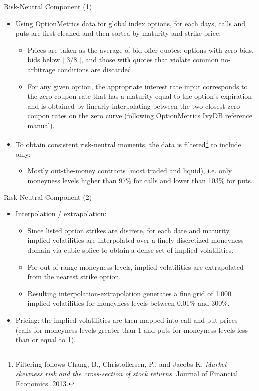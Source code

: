 \documentclass{beamer}
\begin{document}
\begin{frame}{Risk-Neutral Component (1)}
\begin{itemize}
\item Using OptionMetrics data for global index options, for each days, calls and puts are first cleaned and then sorted by maturity and strike price:
	\begin{itemize}
	\item Prices are taken as the average of bid-offer quotes; options with zero bids, bids below [ 3/8 ], and those with quotes that violate common no-arbitrage conditions are discarded.
	\item For any given option, the appropriate interest rate input corresponds to the zero-coupon rate that has a maturity equal to the option's expiration and is obtained by linearly 				interpolating between the two closest zero-coupon rates on the zero curve (following OptionMetrics IvyDB reference manual).
	\end{itemize}
\vfill	
\item To obtain consistent risk-neutral moments, the data is filtered\footnote{\tiny Filtering follows Chang, B., Christoffersen, P., and Jacobs K. {\em Market skewness risk and the cross-section of stock returns.} Journal of Financial Economics. 2013.} to include only:
	\begin{itemize}
	\item Mostly out-the-money contracts (most traded and liquid), i.e. only moneyness levels higher than 97\% for calls and lower than 103\% for puts.
	\end{itemize}
\vfill
\end{itemize}
\end{frame}

\begin{frame}{Risk-Neutral Component (2)}
\begin{itemize}
\item Interpolation / extrapolation:
	\begin{itemize}
	\item Since listed option strikes are discrete, for each date and maturity, implied volatilities are interpolated over a finely-discretized moneyness domain via cubic splice to obtain a dense 			set of implied volatilities.
	\item For out-of-range moneyness levels, implied volatilities are extrapolated from the nearest strike option.
	\item Resulting interpolation-extrapolation generates a fine grid of 1,000 implied volatilities for moneyness levels between 0.01\% and 300\%.
	\end{itemize}
\vfill
\item Pricing: the implied volatilities are then mapped into call and put prices (calls for moneyness levels greater than 1 and puts for moneyness levels less than or equal to 1).
\vfill
\end{itemize}
\end{frame}
\end{document}
